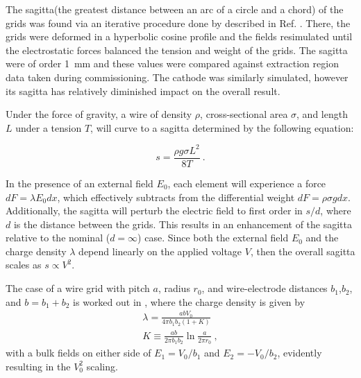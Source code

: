 The sagitta(the greatest distance between an arc of a circle and a chord) of the grids was found via an iterative procedure done by described in Ref. \cite{linehan_high_2022}. 
There, the grids were deformed in a hyperbolic cosine profile and the fields resimulated until the electrostatic forces balanced the tension and weight of the grids.
The sagitta were  of order 1~mm and these values were compared against extraction region data taken during commissioning. 
The cathode was similarly simulated, however its sagitta has relatively diminished impact on the overall result.

Under the force of gravity, a wire of density $\rho$, cross-sectional area $\sigma$, and length $L$ under a tension $T$, will curve to a sagitta determined by the following equation\cite{blum_walter_particle_2008}:

\begin{equation}
    s = \frac{\rho g \sigma L^2}{8T}~.
\end{equation}

In the presence of an external field $E_0$, each element will experience a force $dF = \lambda E_0 dx$, which effectively subtracts from the differential weight $dF = \rho \sigma g dx$.
Additionally, the sagitta will perturb the electric field to first order in $s/d$, where $d$ is the distance between the grids.
This results in an enhancement of the sagitta relative to the nominal ($d=\infty$) case.
Since both the external field $E_0$ and the charge density $\lambda$ depend linearly on the applied voltage $V$, then the overall sagitta scales as $s \propto V^2$. 

The case of a wire grid with pitch $a$, radius $r_0$, and wire-electrode distances $b_1$,$b_2$, and $b = b_1+b_2$ is worked out in \cite{mcdonald_kirk_pdf_nodate}, where the charge density is given by
\begin{align}
    \lambda = \frac{abV_0}{4 \pi b_1b_2(1+K)}\\
    K \equiv \frac{ab}{2 \pi b_1b_2} \ln \frac{a}{2 \pi r_0}~,
    \label{eq:k_def}
\end{align}
\noindent
with a bulk fields on either side of $E_1=V_0/b_1$ and $E_2=-V_0/b_2$, evidently resulting in the $V_0^2$ scaling.

